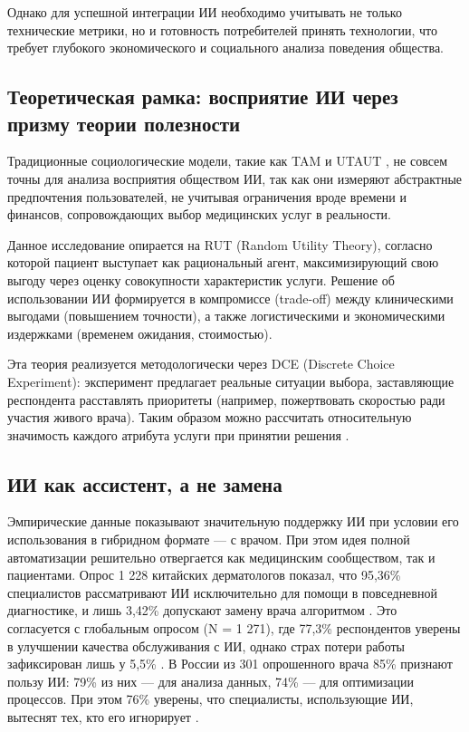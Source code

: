 \documentclass[12pt, a4paper]{article}
\begin{document}
Однако для успешной интеграции ИИ необходимо учитывать не только технические метрики, но и готовность потребителей принять технологии, что требует глубокого экономического и социального анализа поведения общества.

\subsection{Теоретическая рамка: восприятие ИИ через призму теории полезности}
Традиционные социологические модели, такие как TAM \cite{Davis1989} и UTAUT \cite{Venkatesh2003}, не совсем точны для анализа восприятия обществом ИИ, так как они измеряют абстрактные предпочтения пользователей, не учитывая ограничения вроде времени и финансов, сопровождающих выбор медицинских услуг в реальности.

Данное исследование опирается на RUT (Random Utility Theory), согласно которой пациент выступает как рациональный агент, максимизирующий свою выгоду через оценку совокупности характеристик услуги. Решение об использовании ИИ формируется в компромиссе (trade-off) между клиническими выгодами (повышением точности), а также логистическими и экономическими издержками (временем ожидания, стоимостью).

Эта теория реализуется методологически через DCE (Discrete Choice Experiment): эксперимент предлагает реальные ситуации выбора, заставляющие респондента расставлять приоритеты (например, пожертвовать скоростью ради участия живого врача). Таким образом можно рассчитать относительную значимость каждого атрибута услуги при принятии решения \cite{Jagemann2024, Liu2021}.

\subsection{ИИ как ассистент, а не замена}
Эмпирические данные показывают значительную поддержку ИИ при условии его использования в гибридном формате — с врачом. При этом идея полной автоматизации решительно отвергается как медицинским сообществом, так и пациентами. Опрос 1 228 китайских дерматологов показал, что 95,36\% специалистов рассматривают ИИ исключительно для помощи в повседневной диагностике, и лишь 3,42\% допускают замену врача алгоритмом \cite{Shen2020}. Это согласуется с глобальным опросом (N = 1 271), где 77,3\% респондентов уверены в улучшении качества обслуживания с ИИ, однако страх потери работы зафиксирован лишь у 5,5\% \cite{Polesie2020}. В России из 301 опрошенного врача 85\% признают пользу ИИ: 79\% из них — для анализа данных, 74\% — для оптимизации процессов. При этом 76\% уверены, что специалисты, использующие ИИ, вытеснят тех, кто его игнорирует \cite{Orlova2023}.
\end{document}
